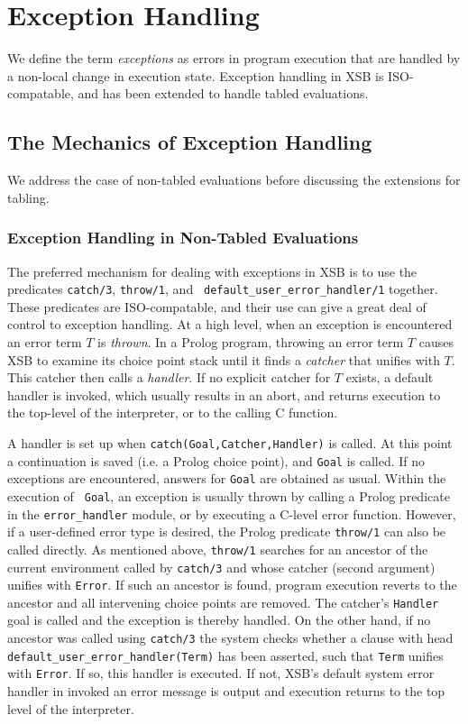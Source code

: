 \chapter{Exception Handling}\label{chap:exception}

We define the term {\em exceptions} as errors in program execution
that are handled by a non-local change in execution state.  Exception
handling in XSB is ISO-compatable, and has been extended to handle
tabled evaluations.  

\section{The Mechanics of Exception Handling}
%
We address the case of non-tabled evaluations before discussing the
extensions for tabling.

\subsection{Exception Handling in Non-Tabled Evaluations}
%
The preferred mechanism for dealing with exceptions in XSB is to use
the predicates {\tt catch/3}, {\tt throw/1}, and {\tt
  default\_user\_error\_handler/1} together.  These predicates are
ISO-compatable, and their use can give a great deal of control to
exception handling.  At a high level, when an exception is encountered
an error term $T$ is {\em thrown}.  In a Prolog program, throwing an
error term $T$ causes XSB to examine its choice point stack until it
finds a {\em catcher} that unifies with $T$.  This catcher then calls
a {\em handler}.  If no explicit catcher for $T$ exists, a default
handler is invoked, which usually results in an abort, and returns
execution to the top-level of the interpreter, or to the calling C
function.

A handler is set up when {\tt catch(Goal,Catcher,Handler)} is called.
At this point a continuation is saved (i.e. a Prolog choice point),
and {\tt Goal} is called.  If no exceptions are encountered, answers
for {\tt Goal} are obtained as usual.  Within the execution of {\tt
  Goal}, an exception is usually thrown by calling a Prolog predicate
in the {\tt error\_handler} module, or by executing a C-level error
function.  However, if a user-defined error type is desired, the
Prolog predicate {\tt throw/1} can also be called directly.  As
mentioned above, {\tt throw/1} searches for an ancestor of the current
environment called by {\tt catch/3} and whose catcher (second
argument) unifies with {\tt Error}.  If such an ancestor is found,
program execution reverts to the ancestor and all intervening choice
points are removed.  The catcher's {\tt Handler} goal is called and
the exception is thereby handled.  On the other hand, if no ancestor
was called using {\tt catch/3} the system checks whether a clause with
head {\tt default\_user\_error\_handler(Term)} has been asserted, such
that {\tt Term} unifies with {\tt Error}.  If so, this handler is
executed.  If not, XSB's default system error handler in invoked an
error message is output and execution returns to the top level of the
interpreter.

